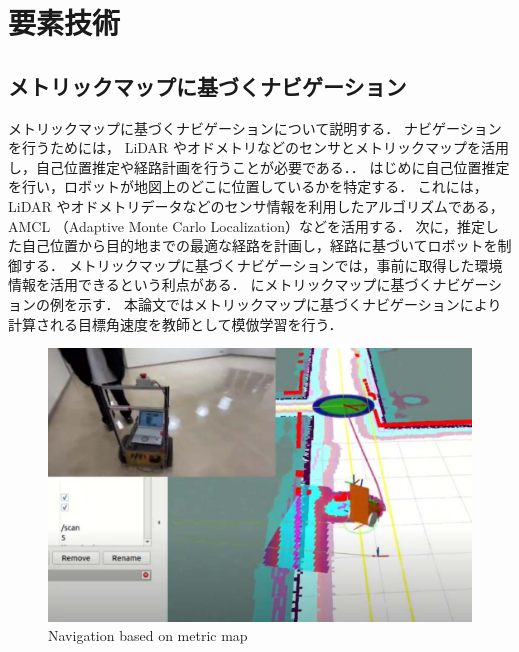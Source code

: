 \chapter{要素技術}
\section{メトリックマップに基づくナビゲーション}
メトリックマップに基づくナビゲーションについて説明する．
ナビゲーションを行うためには， LiDAR やオドメトリなどのセンサとメトリックマップを活用し，自己位置推定や経路計画を行うことが必要である．．
はじめに自己位置推定を行い，ロボットが地図上のどこに位置しているかを特定する．
これには， LiDAR やオドメトリデータなどのセンサ情報を利用したアルゴリズムである， AMCL （Adaptive Monte Carlo Localization）などを活用する．
次に，推定した自己位置から目的地までの最適な経路を計画し，経路に基づいてロボットを制御する．
メトリックマップに基づくナビゲーションでは，事前に取得した環境情報を活用できるという利点がある．
にメトリックマップに基づくナビゲーションの例を示す．
本論文ではメトリックマップに基づくナビゲーションにより計算される目標角速度を教師として模倣学習を行う．

\begin{figure}[htbp]
  \centering
  \includegraphics[width=130mm]{images/pdf/other/nav.pdf}
  \caption{Navigation based on metric map}
  \label{fig:nav}
\end{figure}